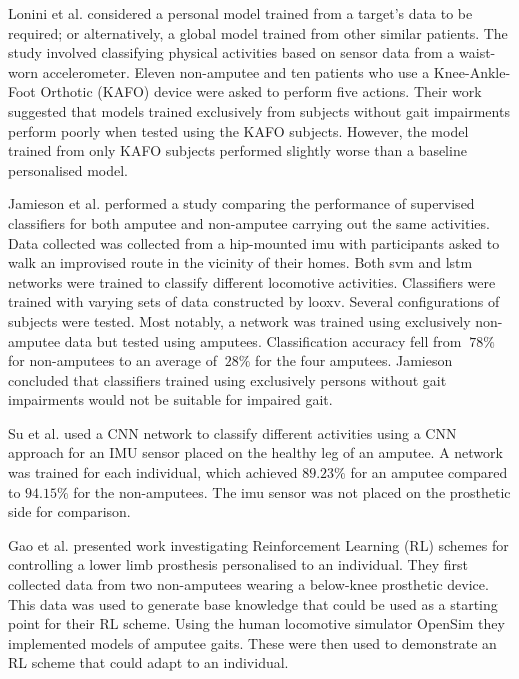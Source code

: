 Lonini et al. considered a personal model trained from a target's data to be required; or alternatively, a global model trained from other similar patients. The study involved classifying physical activities based on sensor data from a waist-worn accelerometer. Eleven non-amputee and ten patients who use a Knee-Ankle-Foot Orthotic (KAFO) device were asked to perform five actions. Their work suggested that models trained exclusively from subjects without gait impairments perform poorly when tested using the KAFO subjects. However, the model trained from only KAFO subjects performed slightly worse than a baseline personalised model.\cite{Lonini2016}

Jamieson et al. performed a study comparing the performance of supervised classifiers for both amputee and non-amputee carrying out the same activities. Data collected was collected from a hip-mounted \acrshort{imu} with participants asked to walk an improvised route in the vicinity of their homes. Both \acrfull{svm} and \acrshort{lstm} networks were trained to classify different locomotive activities. Classifiers were trained with varying sets of data constructed by \acrfull{looxv}. Several configurations of subjects were tested. Most notably, a network was trained using exclusively non-amputee data but tested using amputees. Classification accuracy fell from $~78\%$ for non-amputees to an average of $~28\%$ for the four amputees. Jamieson concluded that classifiers trained using exclusively persons without gait impairments would not be suitable for impaired gait.\cite{Jamieson2021}

Su et al. used a CNN network to classify different activities using a CNN approach for an IMU sensor placed on the healthy leg of an amputee. A network was trained for each individual, which achieved $89.23\%$ for an amputee compared to $94.15\%$ for the non-amputees. The \acrshort{imu} sensor was not placed on the prosthetic side for comparison.\cite{Su2019}

Gao et al. presented work investigating Reinforcement Learning (RL) schemes for controlling a lower limb prosthesis personalised to an individual. They first collected data from two non-amputees wearing a below-knee prosthetic device. This data was used to generate base knowledge that could be used as a starting point for their RL scheme. Using the human locomotive simulator OpenSim they implemented models of amputee gaits. These were then used to demonstrate an RL scheme that could adapt to an individual.\cite{Gao2020a}

